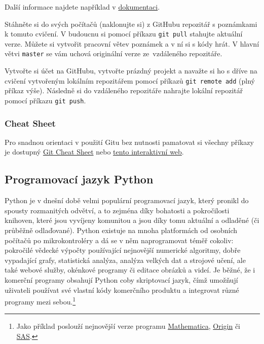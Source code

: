 \documentclass[a4paper,11pt,twoside]{article}
\def\code#1{\textnormal{\texttt{#1}}}
\theoremstyle{red}
\theoremstyle{green}
\begin{document}
    Další informace najdete například v \href{https://git-scm.com/book/cs/v2/Z%C3%A1klady-pr%C3%A1ce-se-syst%C3%A9mem-Git-Pr%C3%A1ce-se-vzd%C3%A1len%C3%BDmi-repozit%C3%A1%C5%99i}{dokumentaci}.

    \begin{voluntary}
        Stáhněte si do svých počítačů (naklonujte si) z GitHubu repozitář s poznámkami k tomuto cvičení.
        V budoucnu si pomocí příkazu \code{git pull} stahujte aktuální verze.
        Můžete si vytvořit pracovní větev poznámek a v ní si s kódy hrát.
        V hlavní větvi \code{master} se vám uchová originální verze ze~vzdáleného repozitáře.
    \end{voluntary}

    \begin{voluntary}
        Vytvořte si účet na GitHubu, vytvořte prázdný projekt a navažte si ho s dříve na cvičení vytvořeným lokálním repozitářem pomocí příkazů \code{git remote add} (plný příkaz výše).
        Následně si do vzdáleného repozitáře nahrajte lokální repozitář pomocí příkazu \code{git push}. 
    \end{voluntary}

\subsubsection{Cheat Sheet}
    Pro snadnou orientaci v použití Gitu bez nutnosti pamatovat si všechny příkazy je dostupný \href{https://training.github.com/downloads/github-git-cheat-sheet.pdf}{Git Cheat Sheet} nebo \href{https://ndpsoftware.com/git-cheatsheet.html}{tento interaktivní web}.

\subsection{Programovací jazyk Python}
    Python je v dnešní době velmi populární programovací jazyk, který pronikl do spousty rozmanitých odvětví, a to zejména díky bohatosti a pokročilosti knihoven, které jsou vyvíjeny komunitou a jsou díky tomu aktuální a odladěné (či průběžně odlaďované).
    Python existuje na mnoha platformách od osobních počítačů po mikrokontroléry a dá se v něm naprogramovat téměř cokoliv: pokročilé vědecké výpočty používající nejnovější numerické algoritmy, dobře vypadající grafy, statistická analýza, analýza velkých dat a strojové učení, ale také webové služby, okénkové programy či editace obrázků a videí.
    Je běžné, že i komerční programy obsahují Python coby skriptovací jazyk, čímž umožňují uživateli používat své vlastní kódy  komerčního produktu a integrovat různé programy mezi sebou.\footnote{
        Jako příklad poslouží nejnovější verze programu \href{https://www.wolfram.com/language/12/external-system-integration/evaluate-python-in-a-notebook.html}{Mathematica}, \href{https://www.originlab.com/doc/python/Run-Python-in-Origin}{Origin} či \href{https://developer.sas.com/guides/python.html}{SAS}.
    }
    
\end{document}
